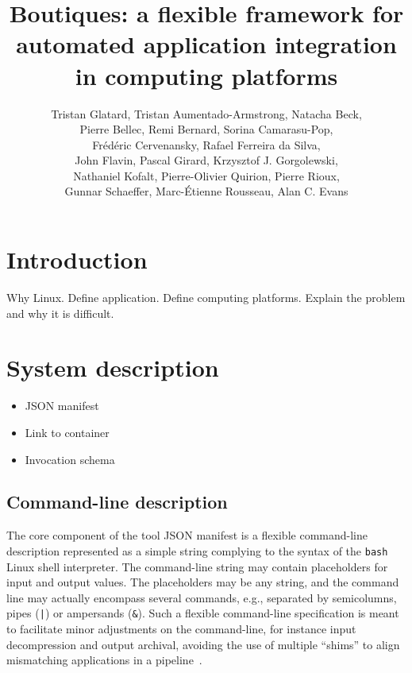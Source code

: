 \documentclass{article}
\title{Boutiques: a flexible framework for automated application integration in computing platforms}
\begin{document}
\author{Tristan Glatard, Tristan Aumentado-Armstrong, Natacha Beck, \\
  Pierre Bellec, Remi Bernard, Sorina Camarasu-Pop, \\
  Fr\'ed\'eric Cervenansky, Rafael Ferreira da Silva, \\ 
  John Flavin, Pascal Girard, Krzysztof J. Gorgolewski, \\
  Nathaniel Kofalt, Pierre-Olivier Quirion, Pierre Rioux, \\
  Gunnar Schaeffer, Marc-\'Etienne Rousseau, Alan C. Evans}

\maketitle

\section{Introduction}

Why Linux. Define application. Define computing platforms. Explain the problem and why it is difficult.

\section{System description}

\begin{itemize}
\item JSON manifest
\item Link to container
\item Invocation schema
\end{itemize}

\subsection{Command-line description}

The core component of the tool JSON manifest is a flexible
command-line description represented as a simple string complying to
the syntax of the \texttt{bash} Linux shell interpreter. The
command-line string may contain placeholders for input and output
values. The placeholders may be any string, and the command line may
actually encompass several commands, e.g., separated by semicolumns,
pipes (\texttt{|}) or ampersands (\texttt{\&}). Such a flexible
command-line specification is meant to facilitate minor adjustments on
the command-line, for instance input decompression and output
archival, avoiding the use of multiple ``shims'' to align mismatching
applications in a pipeline~\cite{hull2004treating}.
\end{document}

